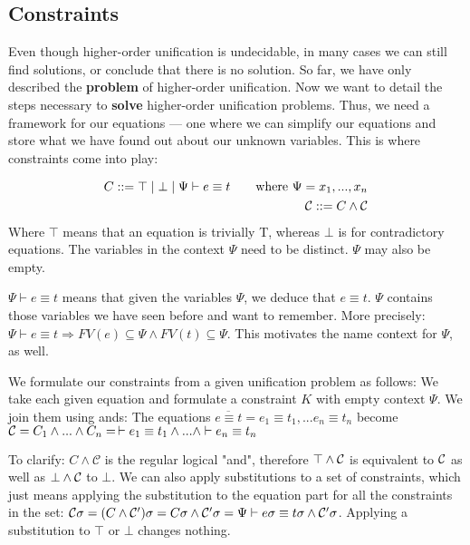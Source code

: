 \documentclass[twoside,12pt,a4paper]{article}
\begin{document}
\subsection{Constraints}

Even though higher-order unification is undecidable, in many cases we can still find solutions,
or conclude that there is no solution.
So far, we have only described the \textbf{problem} of higher-order unification. 
Now we want to detail the steps necessary to \textbf{solve} higher-order unification problems.
Thus, we need a framework for our equations --- one where we can simplify our equations
and store what we have found out about our unknown variables. This is where constraints come into play:

\begin{definition}[Constraint]
    \begin{align*}
        C ::= \top \;|\; \bot \;|\; \Psi \vdash e\equiv t \tag*{where $\Psi = x_1, ..., x_n$}\\
        \mathcal{C} ::= C \wedge \mathcal{C}
    \end{align*}
    Where $\top$ means that an equation is trivially T, whereas $\bot$ is for contradictory equations. 
    The variables in the context $\Psi$ need to be distinct. $\Psi$ may also be empty.
\end{definition}
$\Psi \vdash e\equiv t$ means that given the variables $\Psi$, we deduce that $e\equiv t$.
$\Psi$ contains those variables we have seen before and want to remember.
More precisely: $\Psi \vdash e\equiv t \Rightarrow FV(e)\subseteq \Psi \wedge FV(t)\subseteq \Psi$.
This motivates the name context for $\Psi$, as well.

We formulate our constraints from a given unification problem as follows: %
We take each given equation and formulate a constraint $K$ with $\text{empty context }\Psi$. We join them using ands:
The equations $\overline{e\equiv t}= e_1 \equiv t_1, ... e_n\equiv t_n$ become $\mathcal{C} = C_1 \wedge ... \wedge C_n = \, \vdash e_1 \equiv t_1 \wedge ...\wedge \vdash e_n \equiv t_n $  

To clarify: $C \wedge \mathcal{C}$ is the regular logical "and", therefore 
$\top \wedge \mathcal{C}$ is equivalent to $\mathcal{C}$ as well as $\bot \wedge \mathcal{C}$ to $\bot$.
We can also apply substitutions to a set of constraints, which just means applying the substitution to the equation part for all the constraints in the set:
$\mathcal{C} \sigma = (C \wedge \mathcal{C}')\sigma = C \sigma \wedge \mathcal{C}' \sigma  
= \Psi \vdash e\sigma\equiv t\sigma\wedge \mathcal{C}'\sigma$. Applying a substitution to $\top$ or $\bot$ changes nothing.
\end{document}
